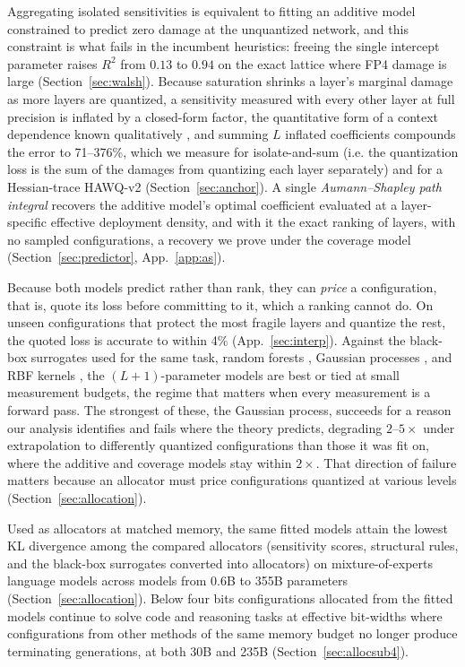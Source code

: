 Aggregating isolated sensitivities is equivalent to fitting an additive model constrained to predict
zero damage at the unquantized network, and this constraint is what fails in the incumbent
heuristics: freeing the single intercept parameter raises $R^2$ from $0.13$ to $0.94$ on the exact
lattice where FP4 damage is large (Section~\ref{sec:walsh}). Because saturation shrinks a layer's
marginal damage as more layers are quantized, a sensitivity measured with every other layer at full
precision is inflated by a closed-form factor, the quantitative form of a context dependence known
qualitatively
\citep{ancona2020shapley,mcgrath2023hydra,impq2025}, and summing $L$ inflated coefficients compounds
the error to 71--376\%, which we measure for isolate-and-sum (i.e. the quantization loss is the sum of the damages from quantizing each layer separately)
 and for a Hessian-trace HAWQ-v2
(Section~\ref{sec:anchor}). A single
\emph{Aumann--Shapley path integral} recovers the additive model's optimal coefficient evaluated at a
layer-specific effective deployment density, and with it the exact ranking of layers, with no sampled
configurations, a recovery we prove under the coverage model (Section~\ref{sec:predictor},
App.~\ref{app:as}).

Because both models predict rather than rank, they can \emph{price} a configuration, that is, quote its
loss before committing to it, which a ranking cannot do. On unseen configurations that protect the most
fragile layers and quantize the rest, the quoted loss is
accurate to within 4\% (App.~\ref{sec:interp}). Against the black-box surrogates used for the same task,
random forests \citep{mico2025}, Gaussian processes \citep{autoqra2026}, and RBF kernels \citep{amq2025},
the $(L{+}1)$-parameter models are best or tied at small measurement budgets, the regime that matters when
every measurement is a forward pass. The strongest of these, the Gaussian process, succeeds for a reason
our analysis identifies and fails where the theory predicts, degrading $2$--$5\times$ under
extrapolation to differently quantized configurations than those it was fit on, where the additive and coverage
models stay within $2\times$. That direction of failure matters because
an allocator must price configurations quantized at various levels
(Section~\ref{sec:allocation}).

Used as allocators at matched memory, the same fitted models attain the lowest KL divergence among the
compared allocators (sensitivity scores, structural rules, and the black-box surrogates converted into
allocators) on mixture-of-experts language models across models from 0.6B to 355B parameters
(Section~\ref{sec:allocation}). Below four bits configurations allocated from the fitted models
continue to solve code and reasoning tasks at effective bit-widths where configurations
from other methods of the same memory budget no longer produce terminating generations, at both 30B and 235B
(Section~\ref{sec:allocsub4}).

